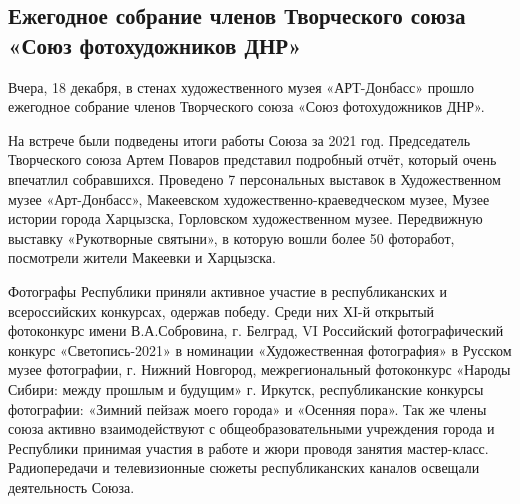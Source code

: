  
 
 
 
 
\subsection{Ежегодное собрание членов Творческого союза «Союз фотохудожников ДНР»}
\label{sec:19_12_2021.stz.news.dnr.artdonbass.1.sojuz_fotohudozhnikov_dnr}


Вчера, 18 декабря, в стенах художественного музея «АРТ-Донбасс» прошло
ежегодное собрание членов Творческого союза «Союз фотохудожников ДНР».


На встрече были подведены итоги работы Союза за 2021 год.  Председатель
Творческого союза Артем Поваров представил подробный отчёт, который очень
впечатлил собравшихся. Проведено 7 персональных выставок в Художественном музее
«Арт-Донбасс», Макеевском художественно-краеведческом музее, Музее истории
города Харцызска, Горловском художественном музее. Передвижную выставку
«Рукотворные святыни», в которую вошли более 50 фоторабот, посмотрели жители
Макеевки и Харцызска. 



Фотографы Республики приняли активное участие в
республиканских и всероссийских конкурсах, одержав победу. Среди них ХI-й
открытый фотоконкурс имени В.А.Собровина, г. Белград, VI Российский
фотографический конкурс «Светопись-2021» в номинации «Художественная
фотография» в Русском музее фотографии, г. Нижний Новгород, межрегиональный
фотоконкурс «Народы Сибири: между прошлым и будущим» г. Иркутск,
республиканские конкурсы фотографии: «Зимний пейзаж моего города» и «Осенняя
пора». Так же члены союза активно взаимодействуют с общеобразовательными
учреждения города и Республики принимая участия в работе и жюри проводя занятия
мастер-класс. Радиопередачи и телевизионные сюжеты республиканских каналов
освещали деятельность Союза.

